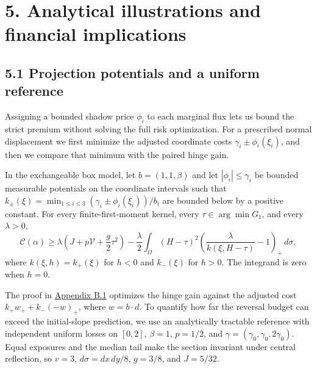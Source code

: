 \section{5. Analytical illustrations and financial implications}\label{sec:illustrations}
\subsection{5.1 Projection potentials and a uniform reference}\label{sec:uniform-reference}

Assigning a bounded shadow price \(\phi_i\) to each marginal flux lets us bound the strict premium without solving the full risk optimization. For a prescribed normal displacement we first minimize the adjusted coordinate costs \(\gamma_i\pm\phi_i(\xi_i)\), and then we compare that minimum with the paired hinge gain.

\begin{proposition}\label{prop:projection-potential-bound}
In the exchangeable box model, let \(b=(1,1,\beta)\) and let \(|\phi_i|\le\gamma_i\) be bounded measurable potentials on the coordinate intervals such that
\(k_\pm(\xi)=\min_{1\le i\le3}(\gamma_i\pm\phi_i(\xi_i))/b_i\)
are bounded below by a positive constant. For every finite-first-moment kernel, every \(\tau\in\arg\min G_1\), and every \(\lambda>0\),
\begin{equation}
\mathcal C(\alpha)\ge
\lambda\left(J+p\mathcal V+\frac g2\tau^2\right)
-\frac{\lambda}{2}\int_\Omega(H-\tau)^2
\left(\frac{\lambda}{k(\xi,H-\tau)}-1\right)_+\,d\sigma,
\tag{5.1}\label{eq:5.1}
\end{equation}
where \(k(\xi,h)=k_+(\xi)\) for \(h<0\) and \(k_-(\xi)\) for \(h>0\). The integrand is zero when \(h=0\).
\end{proposition}

The proof in \hyperref[app:potential-proof]{Appendix B.1} optimizes the hinge gain against the adjusted cost \(k_+w_++k_-(-w)_+\), where \(w=b\cdot d\). To quantify how far the reversal budget can exceed the initial-slope prediction, we use an analytically tractable reference with independent uniform losses on \([0,2]\), \(\beta=1\), \(p=1/2\), and \(\gamma=(\gamma_0,\gamma_0,2\gamma_0)\). Equal exposures and the median tail make the section invariant under central reflection, so \(v=3\), \(d\sigma=dx\,dy/8\), \(g=3/8\), and \(J=5/32\).

